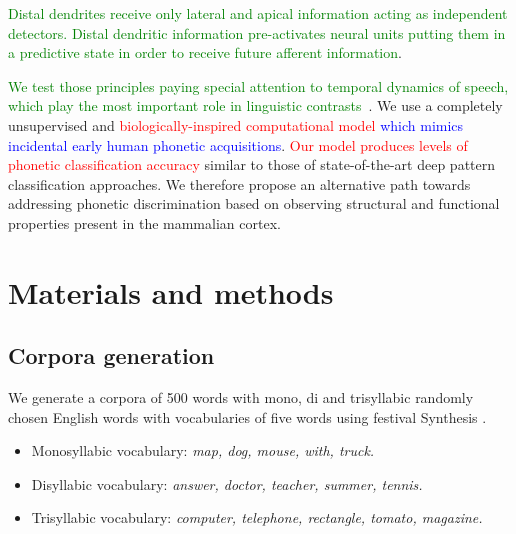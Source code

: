 \documentclass[10pt,letterpaper]{article}
\begin{document}
\textcolor{green}{Distal dendrites receive only lateral and apical information acting as independent detectors. Distal dendritic information pre-activates neural units putting them in a predictive state in order to receive future afferent information}.

\textcolor{green}{We test those principles paying special attention to temporal dynamics of speech, which play the most important role in linguistic contrasts~\cite{doi:10.1098/rstb.1992.0070}}. We use a completely unsupervised and \textcolor{red}{biologically-inspired computational model} \textcolor{blue}{which mimics incidental early human phonetic acquisitions}. \textcolor{red}{Our model produces levels of phonetic classification accuracy} similar to those of state-of-the-art deep pattern classification approaches. We therefore propose an alternative path towards addressing phonetic discrimination based on observing structural and functional properties present in the mammalian cortex.


















\section*{Materials and methods}


\subsection*{Corpora generation}
\label{CorpGen}


We generate a corpora of 500 words with mono, di and trisyllabic randomly chosen English words with vocabularies of five words
using \gls{festival} Synthesis \cite{festival2014}.

\begin{itemize}
	\item Monosyllabic vocabulary: \textit{map, dog, mouse, with, truck.} %
	\item Disyllabic vocabulary: \textit{answer, doctor, teacher, summer, tennis.}  %
	\item Trisyllabic vocabulary: \textit{computer, telephone, rectangle, tomato, magazine.} %
\end{itemize}
\end{document}
